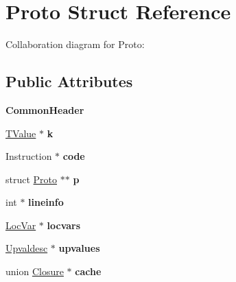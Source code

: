 \hypertarget{struct_proto}{\section{Proto Struct Reference}
\label{struct_proto}
}


Collaboration diagram for Proto\+:
\subsection*{Public Attributes}
\begin{DoxyCompactItemize}
\item 
\hypertarget{struct_proto_a5b0bf6a93e383f0a873573b9c99dfb95}{{\bfseries Common\+Header}}\label{struct_proto_a5b0bf6a93e383f0a873573b9c99dfb95}

\item 
\hypertarget{struct_proto_ae292fb0c0558679704933824ce96eac2}{\hyperlink{structlua___t_value}{T\+Value} $\ast$ {\bfseries k}}\label{struct_proto_ae292fb0c0558679704933824ce96eac2}

\item 
\hypertarget{struct_proto_a53b66e4e4ac4b612a41b67a0ace9b6a5}{Instruction $\ast$ {\bfseries code}}\label{struct_proto_a53b66e4e4ac4b612a41b67a0ace9b6a5}

\item 
\hypertarget{struct_proto_a54dc8e2e8973007794fa0ab0e4a71461}{struct \hyperlink{struct_proto}{Proto} $\ast$$\ast$ {\bfseries p}}\label{struct_proto_a54dc8e2e8973007794fa0ab0e4a71461}

\item 
\hypertarget{struct_proto_a7b35e79a276933f7e71edceec5b4593d}{int $\ast$ {\bfseries lineinfo}}\label{struct_proto_a7b35e79a276933f7e71edceec5b4593d}

\item 
\hypertarget{struct_proto_a41d627972548e1a6aaf358480ed46f69}{\hyperlink{struct_loc_var}{Loc\+Var} $\ast$ {\bfseries locvars}}\label{struct_proto_a41d627972548e1a6aaf358480ed46f69}

\item 
\hypertarget{struct_proto_a028070514796b4accbd99c59e6b83930}{\hyperlink{struct_upvaldesc}{Upvaldesc} $\ast$ {\bfseries upvalues}}\label{struct_proto_a028070514796b4accbd99c59e6b83930}

\item 
\hypertarget{struct_proto_a5167cc41cf28890fb75e2c08715ddc43}{union \hyperlink{union_closure}{Closure} $\ast$ {\bfseries cache}}\label{struct_proto_a5167cc41cf28890fb75e2c08715ddc43}


\end{DoxyCompactItemize}
